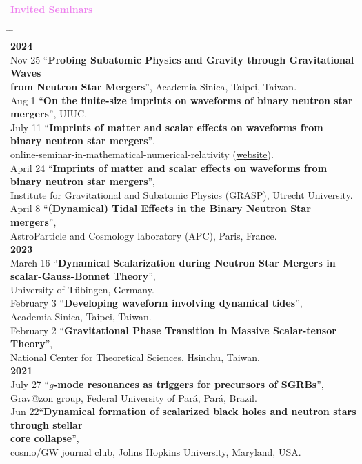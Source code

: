 \documentclass[10pt,floatfix,a4paper]{article}
\newcommand{\hk}[1]{\textcolor{Violet}{#1}}
\begin{document}
{\large \bf \hk{Invited Seminars}}
\begin{tabbing}
  \hspace*{5mm} \= \hspace*{2cm} \= \hspace*{10cm} \\[-3ex]
  \> {\bf 2024} \> \\[1ex]
  \> Nov 25 \> ``\textbf{Probing Subatomic Physics and Gravity through Gravitational Waves}\\
  \> \> \textbf{from Neutron Star Mergers}'', Academia Sinica, Taipei, Taiwan. \\
  \> Aug 1 \> ``\textbf{On the finite-size imprints on waveforms of binary neutron star mergers}'', UIUC. \\  
  \> July 11 \> ``\textbf{Imprints of matter and scalar effects on waveforms from binary neutron star mergers}'',\\
  \> \> online-seminar-in-mathematical-numerical-relativity (\href{https://github.com/Mathematical-Numerical-Relativity/Online-Seminar/wiki}{website}). \\
  \> April 24 \> ``\textbf{Imprints of matter and scalar effects on waveforms from binary neutron star mergers}'',\\
  \> \>  Institute for Gravitational and Subatomic Physics (GRASP), Utrecht University.\\
  \> April 8 \> ``\textbf{(Dynamical) Tidal Effects in the Binary Neutron Star mergers}'',\\
  \> \> AstroParticle and Cosmology laboratory (APC), Paris, France. \\
  \> {\bf 2023} \> \\[1ex]
  \> March 16 \> ``\textbf{Dynamical Scalarization during Neutron Star Mergers in scalar-Gauss-Bonnet Theory}'', \\
  \> \> University of T{\"u}bingen, Germany.\\
  \> February 3 \> ``\textbf{Developing waveform involving dynamical tides}'', \\
  \> \> Academia Sinica, Taipei, Taiwan.\\
  \> February 2 \> ``\textbf{Gravitational Phase Transition in
  Massive Scalar-tensor Theory}'', \\
  \> \> National Center for Theoretical Sciences, Hsinchu, Taiwan.\\
  \> {\bf 2021} \> \\[1ex]
  \> July 27 \>``\textbf{$g$-mode resonances as triggers for precursors of SGRBs}'', \\ 
  \> \> Grav@zon group, Federal University of Pará, Pará, Brazil. \\
  \> Jun 22\>``\textbf{Dynamical formation of scalarized black holes and neutron stars through stellar}\\
  \> \> \textbf{core collapse}'', \\ 
  \> \> cosmo/GW journal club, Johns Hopkins University, Maryland, USA.
\end{tabbing}
\end{document}
